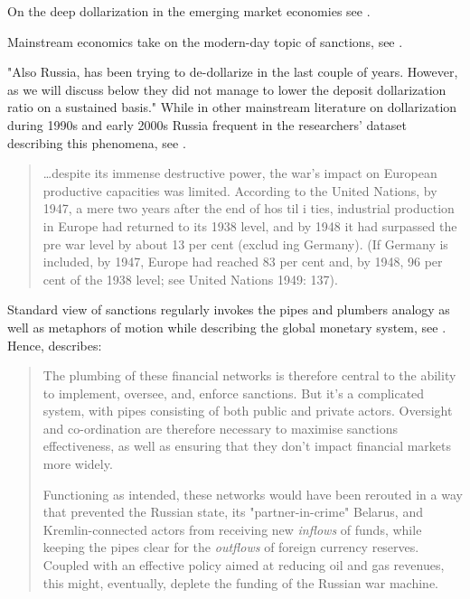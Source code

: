 On the deep dollarization in the emerging market economies see \citep{camb2023}.

Mainstream economics take on the modern-day topic of sanctions, see \citep{NBERw31852}.

"Also Russia, has been trying to 
de-dollarize in the last couple of years. However, as we will discuss below they did not 
manage to lower the deposit dollarization ratio on a sustained basis." \citep{bis2007} While in other mainstream literature on dollarization during 1990s and early 2000s Russia frequent in the researchers' dataset describing this phenomena, see \citep{NBERw10015}.

\begin{quote}
\dots despite its immense destructive power, the war's 
impact on European productive capacities was limited. According to the 
United Nations, by 1947, a mere two years after the end of hos til i ties, 
industrial production in Europe had returned to its 1938 level, and by 1948 
it had surpassed the pre war level by about 13 per cent (exclud ing Germany). 
(If Germany is included, by 1947, Europe had reached 83 per cent and, by 
1948, 96 per cent of the 1938 level; see United Nations 1949: 137). \cite[p.~41]{alacevich2023}
\end{quote}

Standard view of sanctions regularly invokes the pipes and plumbers analogy as well as metaphors of motion while describing the global monetary system, see \citep{hess2023,hess2024}. Hence, \citeauthor{hess2024} describes:

\begin{quote}
The plumbing of these financial networks is therefore central to the ability to implement, oversee, and, enforce sanctions. But it's a complicated system, with pipes consisting of both public and private actors. Oversight and co-ordination are therefore necessary to maximise sanctions effectiveness, as well as ensuring that they don't impact financial markets more widely. \par
Functioning as intended, these networks would have been rerouted in a way that prevented the Russian state, its "partner-in-crime" Belarus, and Kremlin-connected actors from receiving new \textit{inflows} of funds, while keeping the pipes clear for the \textit{outflows} of foreign currency reserves. Coupled with an effective policy aimed at reducing oil and gas revenues, this might, eventually, deplete the funding of the Russian war machine. \citep[emphasis original]{hess2024}
\end{quote}

